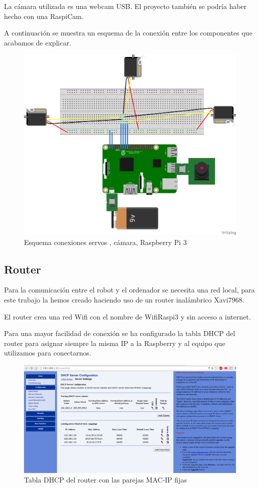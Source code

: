 \documentclass[twoside, 12pt]{epstfg}
\begin{document}
La cámara utilizada es una webcam USB. El proyecto también se podría haber hecho con una RaspiCam.

A continuación se muestra un esquema de la conexión entre los componentes que acabamos de explicar.


\begin{figure}[h]
	\centerline{
		\mbox{\includegraphics[width=.95\textwidth]{images/EsquemaServos.png}}
	}
	\caption{Esquema conexiones servos , cámara, Raspberry Pi 3}
\end{figure}


\subsection{Router}
Para la comunicación entre el robot y el ordenador se necesita una red local,  para este trabajo la hemos creado haciendo uso de un router inalámbrico Xavi7968.

El router crea una red Wifi con el nombre de WifiRaspi3 y sin acceso a internet.

Para una mayor facilidad de conexión se ha configurado la tabla DHCP del router para asignar siempre la misma IP a la Raspberry y al equipo que utilizamos para conectarnos.

\begin{figure}[h]
	\centerline{
		\mbox{\includegraphics[width=.95\textwidth]{images/TablaDHCP2.png}}
	}
	\caption{Tabla DHCP del router con las parejas MAC-IP fijas}
\end{figure}
\end{document}
